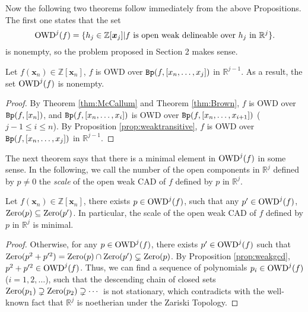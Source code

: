 \documentclass[amsthm]{elsart}
\def \OWD  {{\rm OWD}}
\def \Bproj  {{\tt Bp}}
\def  \zero {{\rm Zero}}
\def \RR {{\mathbb R}}
\def \ZZ {{\mathbb Z}}
\newcommand{\xx}{\bm{x}}
\begin{document}
Now the following two theorems follow immediately from the above Propositions. The first one states that the set $$\OWD^j(f)=\{h_j\in\ZZ[\xx_j]|f\text{ is open weak delineable over }h_j\text{ in } \RR^j\}.$$
 is nonempty, so the problem proposed in Section 2 makes sense. \begin{thm}\label{thm:owdnepty}
Let $f(\xx_n)\in\ZZ[\xx_n]$, $f$ is OWD over $\Bproj(f,[x_n,\ldots,x_{j}])$ in $\RR^{j-1}$. As a result, the set $\OWD^j(f)$ is nonempty.
\end{thm}
\begin{proof}
By Theorem \ref{thm:McCallum} and Theorem \ref{thm:Brown}, $f$ is OWD over $\Bproj(f,[x_n])$, and $\Bproj(f,[x_n,\ldots,x_{i}])$ is OWD over $\Bproj(f,[x_n,\ldots,x_{i+1}])$ ($j-1\le i\le n$). By Proposition \ref{prop:weaktransitive}, $f$ is OWD over $\Bproj(f,[x_n,\ldots,x_{j}])$ in $\RR^{j-1}$.
\end{proof}
The next theorem says that there is a minimal element in $\OWD^j(f)$ in some sense.
 In the following, we call the number of the open components in $\RR^j$ defined by $p\neq0$
 the {\em scale} of the open weak CAD of $f$ defined by $p$ in $\RR^j$.
\begin{thm}
Let $f(\xx_n)\in\ZZ[\xx_n]$, there exists $p\in\OWD^j(f)$, such that any $p'\in\OWD^j(f)$, $\zero(p)\subseteq\zero(p')$. In particular, the scale of the open weak CAD of $f$ defined by $p$ in $\RR^j$ is minimal.
\end{thm}
\begin{proof}
  Otherwise, for any $p\in\OWD^j(f)$, there exists $p'\in\OWD^j(f)$ such that $\zero(p^2+p'^2)=\zero(p)\cap\zero(p')\subsetneq\zero(p)$. By Proposition \ref{prop:weakgcd}, $p^2+p'^2\in \OWD^j(f)$. Thus, we can find a sequence of polynomials $p_i\in \OWD^j(f)$ ($i=1,2,\ldots$), such that the descending chain of closed sets $\zero(p_1)\supsetneq\zero(p_2)\supsetneq\cdots$ is not stationary, which contradicts with the well-known fact that $\RR^j$ is noetherian under the Zariski Topology.
\end{proof}
\end{document}
